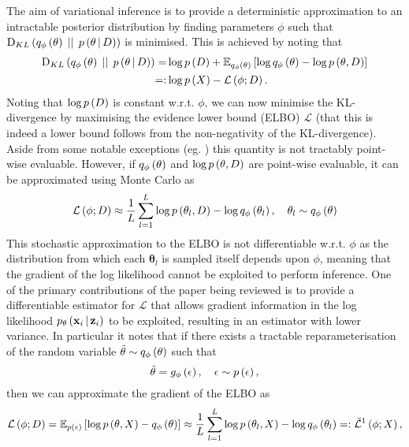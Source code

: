 \documentclass[../report.tex]{subfiles}
\begin{document}
The aim of variational inference is to provide a deterministic approximation to an intractable posterior distribution by finding parameters $\phi$ such that $\textrm{D}_{KL} \left( q_\phi \left( \mathbf{\theta}\right) \, \mid \mid \, p \left(\mathbf{\theta} \, \middle\vert \, D \right)\right)$ is minimised. This is achieved by noting that
\begin{align}
  \textrm{D}_{KL} \left( q_\phi \left( \mathbf{\theta}\right) \, \mid \mid \, p \left(\mathbf{\theta} \, \middle\vert \, D \right)\right) =& \log p \left( D\right) + \mathbb{E}_{q_\phi \left( \mathbf{\theta}\right)} \left[ \log q_\phi \left( \mathbf{\theta}\right)  - \log p \left( \mathbf{\theta} ,D\right) \right] \nonumber \\
  =:& \log p \left( X\right) - \mathcal{L} \left( \phi; D\right).
\end{align}
Noting that $\log p \left( D\right)$ is constant w.r.t. $\phi$, we can now minimise the KL-divergence by maximising the evidence lower bound (ELBO) $\mathcal{L}$ (that this is indeed a lower bound follows from the non-negativity of the KL-divergence). Aside from some notable exceptions (eg. \cite{titsias2009variational}) this quantity is not tractably point-wise evaluable. However, if $q_\phi \left( \mathbf{\theta}\right)$ and $\log p \left( \mathbf{\theta}, D\right)$ are point-wise evaluable, it can be approximated using Monte Carlo as
\begin{equation}
  \mathcal{L} \left( \phi; D\right) \approx \frac{1}{L} \sum_{l=1}^{L} \log p \left( \mathbf{\theta}_l ,D\right) - \log q_\phi \left( \mathbf{\theta}_l\right), \quad \mathbf{\theta}_l \sim q_\phi \left( \mathbf{\theta}\right)
\end{equation}
This stochastic approximation to the ELBO is not differentiable w.r.t. $\phi$ as the distribution from which each $\mathbf{\theta}_l$ is sampled itself depends upon $\phi$, meaning that the gradient of the log likelihood cannot be exploited to perform inference. One of the primary contributions of the paper being reviewed is to provide a differentiable estimator for $\mathcal{L}$ that allows gradient information in the log likelihood $p_\theta \left(\mathbf{x}_i \, \middle\vert \, \mathbf{z}_i \right)$ to be exploited, resulting in an estimator with lower variance. In particular it notes that if there exists a tractable reparameterisation of the random variable $\tilde{\mathbf{\theta}} \sim q_\phi \left( \mathbf{\theta}\right)$ such that
\begin{equation}
  \tilde{\mathbf{\theta}} = g_\phi \left( \epsilon\right), \quad \epsilon \sim p \left( \epsilon\right),
\end{equation}
then we can approximate the gradient of the ELBO as
\begin{equation}
  \mathcal{L} \left( \phi; D\right) = \mathbb{E}_{p \left( \epsilon\right)} \left[ \log p \left( \mathbf{\theta} ,X\right) - q_\phi \left( \mathbf{\theta}\right) \right] \approx \frac{1}{L} \sum_{l=1}^{L} \log p \left( \mathbf{\theta}_l ,X\right) - \log q_\phi \left( \mathbf{\theta}_l\right) =: \tilde{\mathcal{L}}^1 \left( \phi; X\right),
\end{equation}
\end{document}
